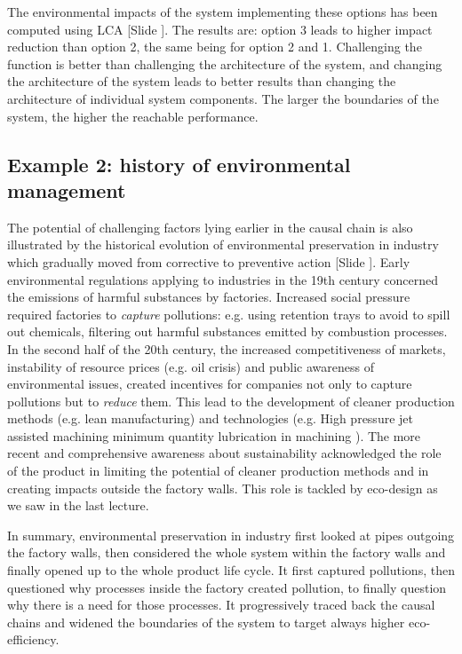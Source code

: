 \documentclass{article}
\newcounter{slide}
\begin{document}
The environmental impacts of the system implementing these options has been computed using LCA {\color{blue}[Slide ]}. The results are: option 3 leads to higher impact reduction than option 2, the same being for option 2 and 1. Challenging the function is better than challenging the architecture of the system, and changing the architecture of the system leads to better results than changing the architecture of individual system components. The larger the boundaries of the system, the higher the reachable performance.

\subsection{Example 2: history of environmental management}
\label{sec:endofpipe}
The potential of challenging factors lying earlier in the causal chain is also illustrated by the historical evolution of environmental preservation in industry which gradually moved from corrective to preventive action {\color{blue}[Slide ]}. Early environmental regulations applying to industries in the 19th century concerned the emissions of harmful substances by factories. Increased social pressure required factories to \emph{capture} pollutions: e.g. using retention trays to avoid to spill out chemicals, filtering out harmful substances emitted by combustion processes. In the second half of the 20th century, the increased competitiveness of markets, instability of resource prices (e.g. oil crisis) and public awareness of environmental issues, created incentives for companies not only to capture pollutions but to \emph{reduce} them. This lead to the development of cleaner production methods (e.g. lean manufacturing) and technologies (e.g. High pressure jet assisted machining \cite{pusavecTransitioningSustainableProduction2010} minimum quantity lubrication in machining \cite{lawalCriticalAssessmentLubrication2013}). The more recent and comprehensive awareness about sustainability acknowledged the role of the product in limiting the potential of cleaner production methods and in creating impacts outside the factory walls. This role is tackled by eco-design as we saw in the last lecture. 

In summary, environmental preservation in industry first looked at pipes outgoing the factory walls, then considered the whole system within the factory walls and finally opened up to the whole product life cycle. It first captured pollutions, then questioned why processes inside the factory created pollution, to finally question why there is a need for those processes. It progressively traced back the causal chains and widened the boundaries of the system to target always higher eco-efficiency. 
\end{document}
